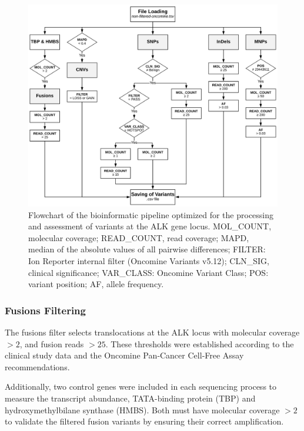 \begin{figure}[ht]
    \centering
    \includegraphics[width=\textwidth]{Images/chapter_4/mut_filtering.png}
    \caption{Flowchart of the bioinformatic pipeline optimized for the processing and assessment of variants at the ALK gene locus. MOL\_COUNT, molecular coverage; READ\_COUNT, read coverage; MAPD, median of the absolute values of all pairwise differences; FILTER: Ion Reporter\texttrademark{} internal filter (Oncomine\texttrademark{} Variants v5.12); CLN\_SIG, clinical significance; VAR\_CLASS: Oncomine\texttrademark{} Variant Class; POS: variant position; AF, allele frequency.}
    \label{fig:Algorithm}
\end{figure}

\subsubsection{Fusions Filtering}

The fusions filter selects translocations at the ALK locus with molecular coverage $> 2$, and fusion reads $> 25$. These thresholds were established according to the clinical study data and the Oncomine\texttrademark{} Pan‐Cancer Cell‐Free Assay recommendations.

Additionally, two control genes were included in each sequencing process to measure the transcript abundance, TATA-binding protein (TBP) and hydroxymethylbilane synthase (HMBS). Both must have molecular coverage $> 2$ to validate the filtered fusion variants by ensuring their correct amplification.

